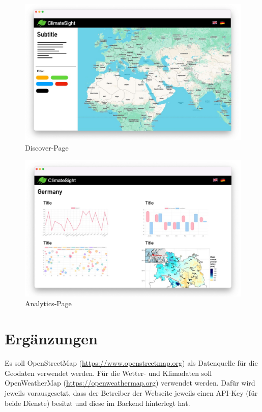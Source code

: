 \documentclass[a4paper]{scrreprt}
\begin{document}
\begin{figure}[ht]
    \centering
    \includegraphics[width=\textwidth]{Kartenansicht.jpg}
    \caption{Discover-Page}
\end{figure}
\begin{figure}[ht]
    \centering
    \includegraphics[width=\textwidth]{Laenderansicht.jpg}
    \caption{Analytics-Page}
\end{figure}



\chapter{Ergänzungen}
Es soll OpenStreetMap (\url{https://www.openstreetmap.org}) als Datenquelle für die Geodaten verwendet werden. Für die Wetter- und Klimadaten soll OpenWeatherMap (\url{https://openweathermap.org}) verwendet werden.
Dafür wird jeweils vorausgesetzt, dass der Betreiber der Webseite jeweils einen API-Key (für beide Dienste) besitzt und diese im Backend hinterlegt hat.
\end{document}
